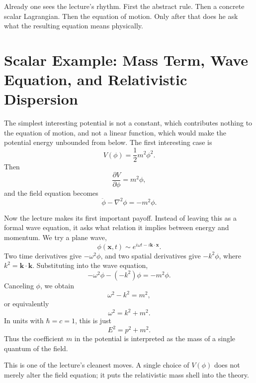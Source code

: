 Already one sees the lecture's rhythm. First the abstract rule. Then a concrete scalar Lagrangian. Then the equation of motion. Only after that does he ask what the resulting equation means physically.

\section{Scalar Example: Mass Term, Wave Equation, and Relativistic Dispersion}

The simplest interesting potential is not a constant, which contributes nothing to the equation of motion, and not a linear function, which would make the potential energy unbounded from below. The first interesting case is
\begin{equation}
V(\phi)=\frac12 m^2\phi^2.
\end{equation}
Then
\begin{equation}
\frac{\partial V}{\partial\phi}=m^2\phi,
\end{equation}
and the field equation becomes
\begin{equation}
\ddot\phi-\nabla^2\phi=-m^2\phi.
\end{equation}

Now the lecture makes its first important payoff. Instead of leaving this as a formal wave equation, it asks what relation it implies between energy and momentum. We try a plane wave,
\begin{equation}
\phi(\mathbf x,t)\sim e^{i\omega t-i\mathbf k\cdot \mathbf x}.
\end{equation}
Two time derivatives give \(-\omega^2\phi\), and two spatial derivatives give \(-k^2\phi\), where \(k^2=\mathbf k\cdot \mathbf k\). Substituting into the wave equation,
\begin{equation}
-\omega^2\phi-(-k^2)\phi=-m^2\phi.
\end{equation}
Canceling \(\phi\), we obtain
\begin{equation}
\omega^2-k^2=m^2,
\end{equation}
or equivalently
\begin{equation}
\omega^2=k^2+m^2.
\end{equation}
In units with \(\hbar=c=1\), this is just
\begin{equation}
E^2=p^2+m^2.
\end{equation}
Thus the coefficient \(m\) in the potential is interpreted as the mass of a single quantum of the field.

This is one of the lecture's cleanest moves. A single choice of \(V(\phi)\) does not merely alter the field equation; it puts the relativistic mass shell into the theory.

